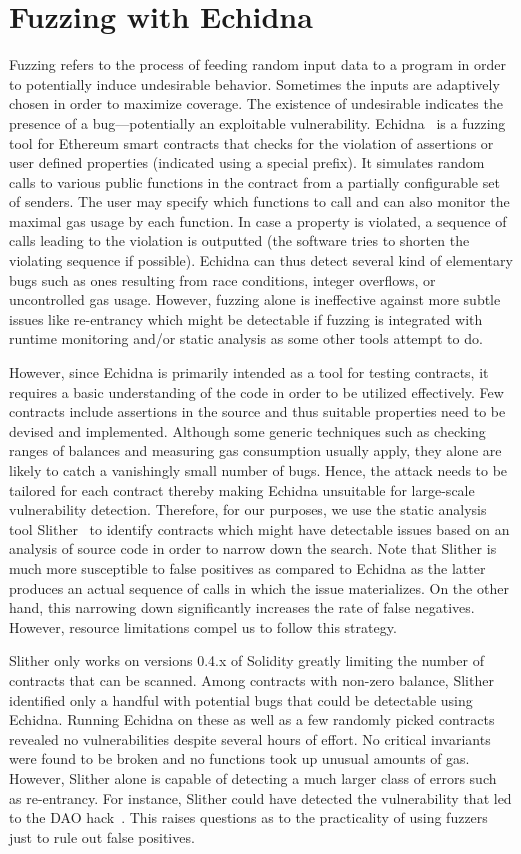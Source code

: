 \section{Fuzzing with Echidna}
Fuzzing refers to the process of feeding random input data to a program in order to potentially induce undesirable behavior. Sometimes the inputs are adaptively chosen in order to maximize coverage. The existence of undesirable indicates the presence of a bug---potentially an exploitable vulnerability. Echidna~\cite{echidna} is a fuzzing tool for Ethereum smart contracts that checks for the violation of assertions or user defined properties (indicated using a special prefix). It simulates random calls to various public functions in the contract from a partially configurable set of senders. The user may specify which functions to call and can also monitor the maximal gas usage by each function. In case a property is violated, a sequence of calls leading to the violation is outputted (the software tries to shorten the violating sequence if possible). Echidna can thus detect several kind of elementary bugs such as ones resulting from race conditions, integer overflows, or uncontrolled gas usage. However, fuzzing alone is ineffective against more subtle issues like re-entrancy which might be detectable if fuzzing is integrated with runtime monitoring and/or static analysis as some other tools attempt to do.

However, since Echidna is primarily intended as a tool for testing contracts, it requires a basic understanding of the code in order to be utilized effectively. Few contracts include assertions in the source and thus suitable properties need to be devised and implemented. Although some generic techniques such as checking ranges of balances and measuring gas consumption usually apply, they alone are likely to catch a vanishingly small number of bugs. Hence, the attack needs to be tailored for each contract thereby making Echidna unsuitable for large-scale vulnerability detection. Therefore, for our purposes, we use the static analysis tool Slither~\cite{slither} to identify contracts which might have detectable issues based on an analysis of source code in order to narrow down the search. Note that Slither is much more susceptible to false positives as compared to Echidna as the latter produces an actual sequence of calls in which the issue materializes. On the other hand, this narrowing down significantly increases the rate of false negatives. However, resource limitations compel us to follow this strategy.

Slither only works on versions 0.4.x of Solidity greatly limiting the number of contracts that can be scanned. Among contracts with non-zero balance, Slither identified only a handful with potential bugs that could be detectable using Echidna. Running Echidna on these as well as a few randomly picked contracts revealed no vulnerabilities despite several hours of effort. No critical invariants were found to be broken and no functions took up unusual amounts of gas. However, Slither alone is capable of detecting a much larger class of errors such as re-entrancy. For instance, Slither could have detected the vulnerability that led to the DAO hack~\cite{slither}. This raises questions as to the practicality of using fuzzers just to rule out false positives.
